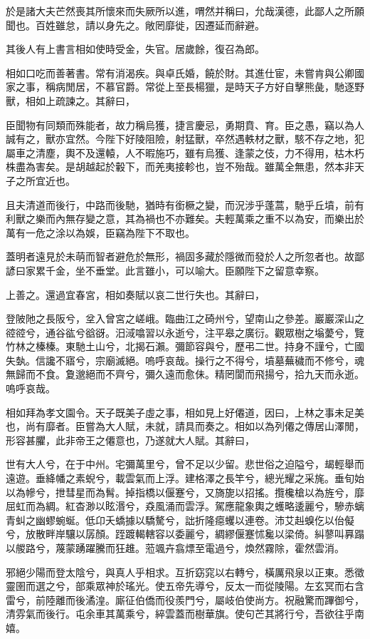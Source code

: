 於是諸大夫芒然喪其所懷來而失厥所以進，喟然并稱曰，允哉漢德，此鄙人之所願聞也。百姓雖怠，請以身先之。敞罔靡徙，因遷延而辭避。

其後人有上書言相如使時受金，失官。居歲餘，復召為郎。

相如口吃而善著書。常有消渴疾。與卓氏婚，饒於財。其進仕宦，未嘗肯與公卿國家之事，稱病閒居，不慕官爵。常從上至長楊獵，是時天子方好自擊熊彘，馳逐野獸，相如上疏諫之。其辭曰，

臣聞物有同類而殊能者，故力稱烏獲，捷言慶忌，勇期賁、育。臣之愚，竊以為人誠有之，獸亦宜然。今陛下好陵阻險，射猛獸，卒然遇軼材之獸，駭不存之地，犯屬車之清塵，輿不及還轅，人不暇施巧，雖有烏獲、逢蒙之伎，力不得用，枯木朽株盡為害矣。是胡越起於轂下，而羌夷接軫也，豈不殆哉。雖萬全無患，然本非天子之所宜近也。

且夫清道而後行，中路而後馳，猶時有銜橛之變，而況涉乎蓬蒿，馳乎丘墳，前有利獸之樂而內無存變之意，其為禍也不亦難矣。夫輕萬乘之重不以為安，而樂出於萬有一危之涂以為娛，臣竊為陛下不取也。

蓋明者遠見於未萌而智者避危於無形，禍固多藏於隱微而發於人之所忽者也。故鄙諺曰家累千金，坐不垂堂。此言雖小，可以喻大。臣願陛下之留意幸察。

上善之。還過宜春宮，相如奏賦以哀二世行失也。其辭曰，

登陂阤之長阪兮，坌入曾宮之嵯峨。臨曲江之碕州兮，望南山之參差。巖巖深山之谾谾兮，通谷谹兮谽谺。汨淢噏習以永逝兮，注平皋之廣衍。觀眾樹之塕薆兮，覽竹林之榛榛。東馳土山兮，北揭石瀨。彌節容與兮，歷弔二世。持身不謹兮，亡國失埶。信讒不寤兮，宗廟滅絕。嗚呼哀哉。操行之不得兮，墳墓蕪穢而不修兮，魂無歸而不食。夐邈絕而不齊兮，彌久遠而愈佅。精罔閬而飛揚兮，拾九天而永逝。嗚呼哀哉。

相如拜為孝文園令。天子既美子虛之事，相如見上好僊道，因曰，上林之事未足美也，尚有靡者。臣嘗為大人賦，未就，請具而奏之。相如以為列僊之傳居山澤閒，形容甚臞，此非帝王之僊意也，乃遂就大人賦。其辭曰，

世有大人兮，在于中州。宅彌萬里兮，曾不足以少留。悲世俗之迫隘兮，朅輕舉而遠遊。垂絳幡之素蜺兮，載雲氣而上浮。建格澤之長竿兮，總光耀之采旄。垂旬始以為幓兮，抴彗星而為髾。掉指橋以偃蹇兮，又旖旎以招搖。攬欃槍以為旌兮，靡屈虹而為綢。紅杳渺以眩湣兮，猋風涌而雲浮。駕應龍象輿之蠖略逶麗兮，驂赤螭青虯之幽蟉蜿蜒。低卬夭蟜據以驕驁兮，詘折隆癋蠼以連卷。沛艾赳螑仡以佁儗兮，放散畔岸驤以孱顏。跮踱輵轄容以委麗兮，綢繆偃蹇怵毚以梁倚。糾蓼叫奡蹋以艐路兮，蔑蒙踴躍騰而狂趡。蒞颯卉翕熛至電過兮，煥然霧除，霍然雲消。

邪絕少陽而登太陰兮，與真人乎相求。互折窈窕以右轉兮，橫厲飛泉以正東。悉徵靈圉而選之兮，部乘眾神於瑤光。使五帝先導兮，反太一而從陵陽。左玄冥而右含雷兮，前陸離而後潏湟。廝征伯僑而役羨門兮，屬岐伯使尚方。祝融驚而蹕御兮，清雰氣而後行。屯余車其萬乘兮，綷雲蓋而樹華旗。使句芒其將行兮，吾欲往乎南嬉。

